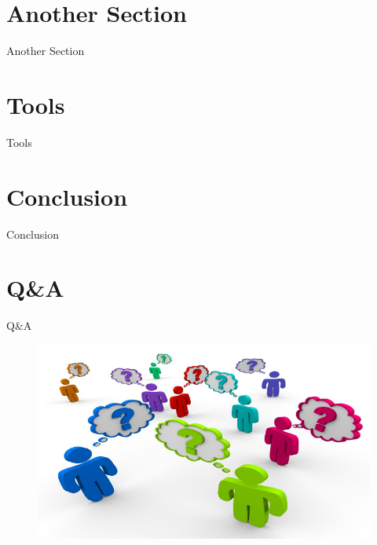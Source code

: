 \documentclass{beamer}
\begin{document}
\section{Another Section}
\begin{frame}{Another Section}

 
  
\end{frame}



\section{Tools}
\begin{frame}{Tools}
  
\end{frame}



\section{Conclusion}

\begin{frame}{Conclusion}
 

\end{frame}

\section{Q\&A}
\begin{frame}{Q\&A}
\begin{figure}
\includegraphics[scale=0.5]{qa}
\end{figure}
\end{frame}
\end{document}
